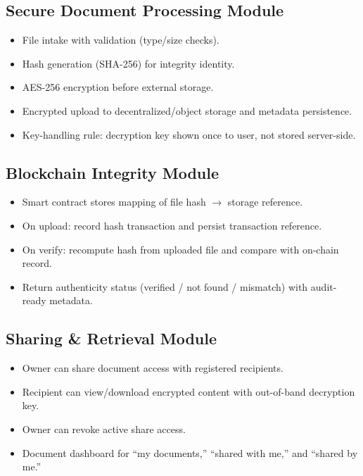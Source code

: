 \documentclass[12pt]{article}
\begin{document}
\subsection{Secure Document Processing Module}

\begin{itemize}
\item File intake with validation (type/size checks).
\item Hash generation (SHA-256) for integrity identity.
\item AES-256 encryption before external storage.
\item Encrypted upload to decentralized/object storage and metadata persistence.
\item Key-handling rule: decryption key shown once to user, not stored server-side.
\end{itemize}

\subsection{Blockchain Integrity Module}

\begin{itemize}
\item Smart contract stores mapping of file hash $\rightarrow$ storage reference.
\item On upload: record hash transaction and persist transaction reference.
\item On verify: recompute hash from uploaded file and compare with on-chain record.
\item Return authenticity status (verified / not found / mismatch) with audit-ready metadata.
\end{itemize}

\subsection{Sharing \& Retrieval Module}

\begin{itemize}
\item Owner can share document access with registered recipients.
\item Recipient can view/download encrypted content with out-of-band decryption key.
\item Owner can revoke active share access.
\item Document dashboard for ``my documents,'' ``shared with me,'' and ``shared by me.''
\end{itemize}
\end{document}
